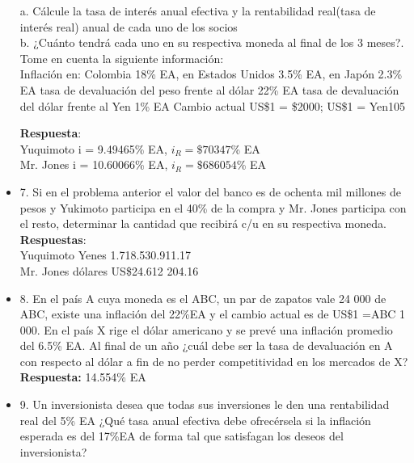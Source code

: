 \begin{itemize}
	a. Cálcule la tasa de interés anual efectiva y la rentabilidad real(tasa de interés real) anual de cada uno de los socios\\
	b. ¿Cuánto tendrá cada uno en su respectiva moneda al final de los 3 meses?. Tome en cuenta la siguiente información:\\
	
	Inflación en: Colombia 18\% EA, en Estados Unidos 3.5\% EA, en Japón 2.3\%  EA tasa de devaluación del peso frente al dólar 22\%  EA tasa de devaluación del dólar frente al Yen 1\% EA Cambio actual US\$1 = \$2000; US\$1 = Yen105
	
	\textbf{Respuesta}:\\
	Yuquimoto i = 9.49465\% EA, $i_{R} = \$7 0347$\% EA\\
	Mr. Jones i = 10.60066\% EA, $i_{R} = \$6 86054$\% EA\\
	
	\medskip
	\item 7. Si en el problema anterior el valor del banco es de ochenta mil millones de pesos y Yukimoto  participa en el 40\% de la compra y Mr. Jones participa con el resto, determinar la cantidad que  recibirá c/u en su respectiva moneda.\\
	\textbf{Respuestas}:\\
	Yuquimoto Yenes 1.718.530.911.17\\ 
	Mr. Jones dólares US\$24.612 204.16\\
	
	\item 8. En el país A cuya moneda es el ABC, un par de zapatos vale 24 000 de ABC, existe una inflación  del 22\%EA y el cambio actual es de US\$1 =ABC 1 000. En el país X rige el dólar americano y se prevé  una inflación promedio del 6.5\% EA. Al final de un año ¿cuál debe ser la tasa de devaluación en A con respecto al dólar a fin de no perder competitividad en los mercados de X?\\
	\medskip
	\textbf{Respuesta:} 14.554\% EA
	\medskip
	\item 9. Un inversionista desea que todas sus inversiones le den una rentabilidad real del 5\% EA ¿Qué  tasa anual efectiva debe ofrecérsela si la inflación esperada es del 17\%EA de forma tal que satisfagan  los deseos del inversionista?
	

\end{itemize}
